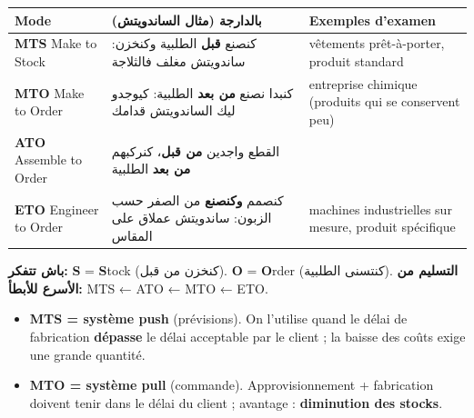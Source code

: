\documentclass[11pt,a4paper]{article}
\newcommand{\ar}[1]{\textarabic{#1}}
\newcommand{\fr}[1]{\textfrench{#1}}
\begin{document}
\begin{center}
\begin{tabularx}{\linewidth}{>{\raggedright\arraybackslash}p{3.6cm} >{\raggedleft\arraybackslash}X >{\raggedright\arraybackslash}X}
\toprule
\textbf{Mode} & \ar{\textbf{بالدارجة (مثال الساندويتش)}} & \textbf{Exemples d'examen} \\
\midrule
\textbf{MTS} Make to Stock & \ar{كنصنع \textbf{قبل} الطلبية وكنخزن: ساندويتش مغلف فالثلاجة} & vêtements prêt-à-porter, produit standard \\
\textbf{MTO} Make to Order & \ar{كنبدا نصنع \textbf{من بعد} الطلبية: كيوجدو ليك الساندويتش قدامك} & entreprise chimique (produits qui se conservent peu) \\
\textbf{ATO} Assemble to Order & \ar{القطع واجدين \textbf{من قبل}، كنركبهم \textbf{من بعد} الطلبية} & \\
\textbf{ETO} Engineer to Order & \ar{كنصمم \textbf{وكنصنع} من الصفر حسب الزبون: ساندويتش عملاق على المقاس} & machines industrielles sur mesure, produit spécifique \\
\bottomrule
\end{tabularx}
\end{center}

\begin{note}
\par\begin{Arabic}
\textbf{باش تتفكر:} \fr{\textbf{S}} = \fr{\textbf{S}tock} (كنخزن من قبل). \fr{\textbf{O}} = \fr{\textbf{O}rder} (كنتسنى الطلبية).
\textbf{التسليم من الأسرع للأبطأ:} \fr{MTS} ← \fr{ATO} ← \fr{MTO} ← \fr{ETO}.
\end{Arabic}
\end{note}

\begin{itemize}
\item \textbf{MTS = système push} (prévisions). On l'utilise quand le délai de fabrication \textbf{dépasse} le délai acceptable par le client ; la baisse des coûts exige une grande quantité.
\item \textbf{MTO = système pull} (commande). Approvisionnement + fabrication doivent tenir dans le délai du client ; avantage : \textbf{diminution des stocks}.
\end{itemize}
\end{document}
